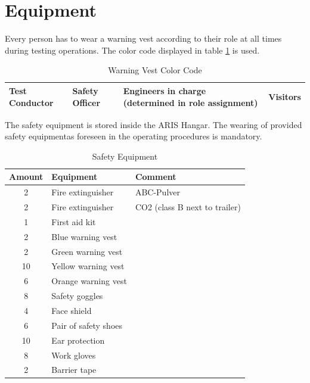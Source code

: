 \documentclass{article}
\begin{document}
\section{Equipment}
Every person has to wear a warning vest according to their role at all times during testing operations. The color code displayed in table \ref{tab:color-code} is used.
\begin{table}[h]
    \caption{Warning Vest Color Code}
    \label{tab:color-code}
    \begin{tabularx}{0.9\textwidth}{|X|X|X|X|}
        \hline
        \cellcolor{cyan} Test Conductor & \cellcolor{green} Safety Officer & \cellcolor{orange} Engineers in charge (determined in role assignment) & \cellcolor{yellow} Visitors \\ \hline
    \end{tabularx}
\end{table}
The safety equipment is stored inside the ARIS Hangar. The wearing of provided safety equipmentas foreseen in the operating procedures is mandatory.
\begin{table}[h]
    \caption{Safety Equipment}
    \label{tab:safety-equipment}
    \begin{tabularx}{0.9\textwidth}{|c|X|X|}
        \hline
        \rowcolor{tableHeaderColor} \textbf{Amount} & \textbf{Equipment} & \textbf{Comment} \\ \hline
        2 & Fire extinguisher & ABC-Pulver \\ \hline
        2 & Fire extinguisher & CO2 (class B next to trailer) \\ \hline
        1 & First aid kit &  \\ \hline
        2 & Blue warning vest & \\ \hline
        2 & Green warning vest & \\ \hline
        10 & Yellow warning vest & \\ \hline
        6 & Orange warning vest & \\ \hline
        8 & Safety goggles & \\ \hline
        4 & Face shield & \\ \hline
        6 & Pair of safety shoes & \\ \hline
        10 & Ear protection & \\ \hline
        8 & Work gloves & \\ \hline
        2 & Barrier tape & \\ \hline
    \end{tabularx}
\end{table}
\end{document}
